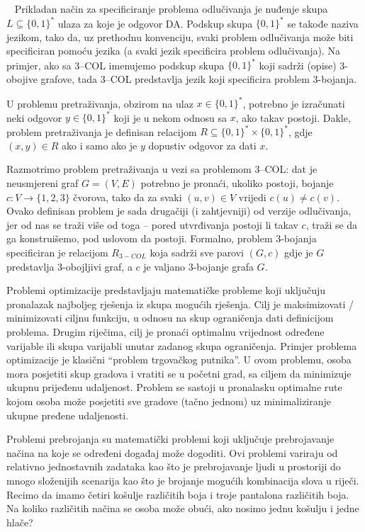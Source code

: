 ~ Prikladan način za specificiranje problema odlučivanja je nuđenje skupa $L \subseteq \{0, 1\}^*$ ulaza za koje je odgovor DA. Podskup skupa $\{0, 1\}^*$ se takođe naziva jezikom, tako da, uz prethodnu konvenciju, svaki problem odlučivanja može biti specificiran pomoću jezika (a svaki jezik specificira problem odlučivanja). Na primjer, ako sa   3--COL imenujemo podskup skupa $\{0, 1\}^*$ koji sadrži (opise) 3-obojive grafove, tada 3--COL predstavlja jezik koji specificira problem 3-bojanja. %

U problemu pretraživanja, obzirom na ulaz $x \in \{0, 1\}^*$, potrebno je izračunati neki odgovor
$y \in  \{0, 1\}^*$ koji je u nekom odnosu sa $x$, ako takav  postoji. Dakle, problem pretraživanja je
definisan relacijom $R \subseteq \{0, 1\}^* \times \{0, 1\}^*$, gdje $(x, y) \in R$ ako i samo ako je $y$ dopustiv odgovor  za dati $x$. 

Razmotrimo problem pretraživanja  u vezi sa problemom 3--COL: dat je
neusmjereni graf $G = (V, E)$ potrebno je pronaći, ukoliko postoji, bojanje $c \colon V \rightarrow \{1, 2, 3\}$
čvorova, tako da za svaki $(u, v) \in V$ vrijedi $c(u) \neq c(v)$. Ovako definisan problem je sada drugačiji (i zahtjevniji) od verzije odlučivanja, jer  od nas se traži  više od toga  --  pored
utvrđivanja postoji li takav $c$, traži se da ga konstruišemo, pod uslovom da postoji.
Formalno, problem 3-bojanja specificiran je relacijom $R_{3-COL}$ koja sadrži sve
parovi $(G, c)$ gdje je $G$ predstavlja 3-obojljivi graf, a $c$ je valjano 3-bojanje grafa $G$.

Problemi optimizacije predstavljaju matematičke probleme koji uključuju pronalazak najboljeg rješenja iz skupa mogućih rješenja. Cilj je maksimizovati / minimizovati   ciljnu funkciju, u odnosu na skup  ograničenja dati definicijom problema. Drugim riječima, cilj je pronaći optimalnu vrijednost određene varijable ili skupa varijabli unutar zadanog skupa ograničenja. Primjer problema optimizacije je klasični ``problem trgovačkog putnika''. U ovom problemu, osoba mora posjetiti skup gradova i vratiti se u   početni grad, sa ciljem da minimizuje ukupnu prijeđenu udaljenost. Problem se sastoji u pronalasku optimalne rute kojom osoba može posjetiti sve gradove (tačno jednom) uz minimaliziranje ukupne pređene udaljenosti.

Problemi prebrojanja su matematički problemi koji uključuje prebrojavanje načina na koje se određeni događaj može dogoditi. Ovi problemi variraju od relativno jednostavnih zadataka kao što je prebrojavanje ljudi u prostoriji do mnogo složenijih scenarija kao što je brojanje   mogućih kombinacija slova u riječi. Recimo da imamo četiri košulje različitih boja i troje pantalona različitih boja. Na koliko različitih načina se osoba može obući, ako nosimo jednu košulju i jedne hlače?

